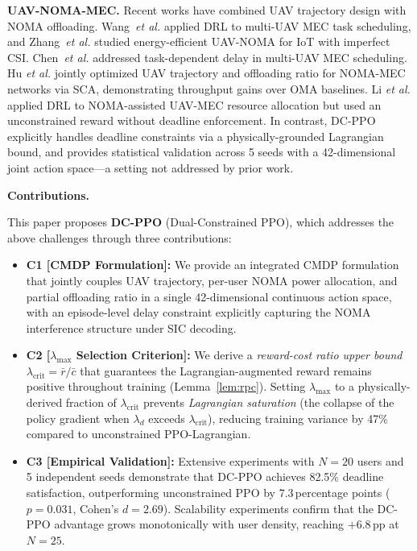 \documentclass[journal]{IEEEtran}
\newcommand{\ld}{\lambda_d}
\begin{document}
\textbf{UAV-NOMA-MEC.}
Recent works have combined UAV trajectory design with NOMA
offloading.
Wang~\emph{et al.} \cite{wang2023uav_mec_drl} applied DRL
to multi-UAV MEC task scheduling, and
Zhang~\emph{et al.} \cite{zhang2023uav_noma_iot} studied
energy-efficient UAV-NOMA for IoT with imperfect CSI.
Chen~\emph{et al.} \cite{chen2024uav_mec_multi} addressed
task-dependent delay in multi-UAV MEC scheduling.
Hu \emph{et al.} \cite{hu2023uav_noma_mec} jointly optimized
UAV trajectory and offloading ratio for NOMA-MEC networks via
SCA, demonstrating throughput gains over OMA baselines.
Li \emph{et al.} \cite{li2022noma_uav_drl} applied DRL to
NOMA-assisted UAV-MEC resource allocation but used an
unconstrained reward without deadline enforcement.
In contrast, DC-PPO explicitly handles deadline constraints
via a physically-grounded Lagrangian bound, and provides
statistical validation across 5 seeds with a 42-dimensional
joint action space---a setting not addressed by prior work.

\noindent\textbf{Contributions.}

This paper proposes \textbf{DC-PPO} (Dual-Constrained PPO),
which addresses the above challenges through three contributions:

\begin{itemize}
  \item \textbf{C1 [CMDP Formulation]:}
    We provide an integrated CMDP formulation that jointly
    couples UAV trajectory, per-user NOMA power allocation, and
    partial offloading ratio in a single 42-dimensional
    continuous action space, with an episode-level delay
    constraint explicitly capturing the NOMA interference
    structure under SIC decoding.

  \item \textbf{C2 [$\lambda_{\max}$ Selection Criterion]:}
    We derive a \emph{reward-cost ratio upper bound}
    $\lambda_{\text{crit}} = \bar{r}/\bar{c}$ that guarantees
    the Lagrangian-augmented reward remains positive throughout
    training (Lemma~\ref{lem:rpc}).
    Setting $\lambda_{\max}$ to a physically-derived fraction of
    $\lambda_{\text{crit}}$ prevents \emph{Lagrangian saturation}
    (the collapse of the policy gradient when $\ld$ exceeds
    $\lambda_{\text{crit}}$), reducing training variance by 47\%
    compared to unconstrained PPO-Lagrangian.

  \item \textbf{C3 [Empirical Validation]:}
    Extensive experiments with $N{=}20$ users and 5 independent
    seeds demonstrate that DC-PPO achieves 82.5\% deadline
    satisfaction, outperforming unconstrained PPO by
    7.3\,percentage points ($p{=}0.031$, Cohen's $d{=}2.69$).
    Scalability experiments confirm that the DC-PPO advantage
    grows monotonically with user density, reaching $+6.8$\,pp
    at $N{=}25$.
\end{itemize}
\end{document}
